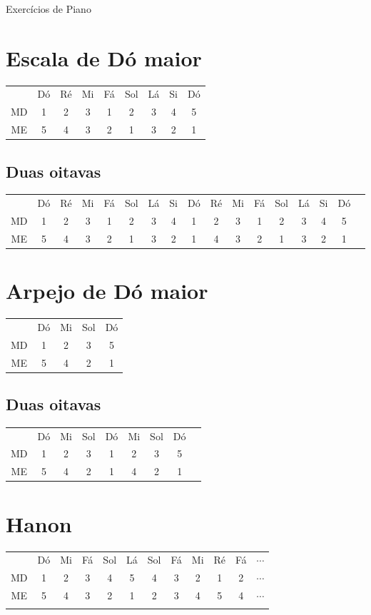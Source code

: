 \documentclass{article}
\begin{document}
\centerline{\huge Exercícios de Piano}

\section*{Escala de Dó maior}
\begin{tabular}{c c c c c c c c c}
    & Dó & Ré & Mi & Fá & Sol & Lá & Si & Dó \\
    MD & 1 & 2 & 3 & 1 & 2 & 3 & 4 & 5 \\ 
    ME & 5 & 4 & 3 & 2 & 1 & 3 & 2 & 1
\end{tabular}

\subsection*{Duas oitavas}
\begin{tabular}{c c c c c c c c c c c c c c c c c}
    & Dó & Ré & Mi & Fá & Sol & Lá & Si & Dó & Ré & Mi & Fá & Sol & Lá & Si & Dó \\
 MD & 1 & 2 & 3 & 1 & 2 & 3 & 4 & 1 & 2 & 3 & 1 & 2 & 3 & 4 & 5 \\ 
 ME & 5 & 4 & 3 & 2 & 1 & 3 & 2 & 1 & 4 & 3 & 2 & 1 & 3 & 2 & 1 
\end{tabular}

\section*{Arpejo de Dó maior}
\begin{tabular}{c c c c c}
    & Dó & Mi & Sol & Dó \\
 MD & 1 & 2 & 3 & 5 \\ 
 ME & 5 & 4 & 2 & 1
\end{tabular}

\subsection*{Duas oitavas}
\begin{tabular}{c c c c c c c c c}
    & Dó & Mi & Sol & Dó & Mi & Sol & Dó\\
 MD & 1 & 2 & 3 & 1 & 2 & 3 & 5 \\ 
 ME & 5 & 4 & 2 & 1 & 4 & 2 & 1
\end{tabular}

\section*{Hanon}
\begin{tabular}{*{12}{c}}
    & Dó & Mi & Fá & Sol & Lá & Sol & Fá & Mi & Ré & Fá & $\cdots$ \\
 MD & 1 & 2 & 3 & 4 & 5 & 4 & 3 & 2 & 1 & 2 & $\cdots$ \\ 
 ME & 5 & 4 & 3 & 2 & 1 & 2 & 3 & 4 & 5 & 4 & $\cdots$ \\
 \newline
\end{tabular}
\end{document}
